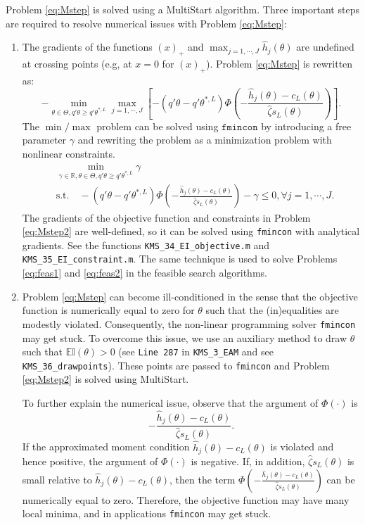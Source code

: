 \documentclass[12pt]{article}
\def\code#1{\texttt{#1}}
\begin{document}
Problem \eqref{eq:Mstep} is solved using a MultiStart algorithm.  Three important steps are required to resolve numerical issues with Problem \eqref{eq:Mstep}:
\begin{enumerate}
\item The gradients of the functions $(x)_{+}$ and $\max_{j=1,\cdots,J} \hat h_j(\theta)$ are undefined at crossing points (e.g, at $x=0$ for $(x)_+$).  Problem \eqref{eq:Mstep} is rewritten as:
     \[
        - \min_{\theta \in \Theta,q'\theta \geq q' \theta^{*,L}} \max_{j=1,\cdots,J}\left[-(q' \theta - q' \theta^{*,L})\Phi \left(- \frac{ \hat h_j(\theta) - c_L(\theta)}{\hat \zeta s_L(\theta)} \right)\right].
     \]
    The $\min/\max$ problem can be solved using $\code{fmincon}$ by introducing a free parameter $\gamma$ and rewriting the problem as a minimization problem with nonlinear constraints.
    \begin{align}\label{eq:Mstep2}
        & \min_{\gamma \in \mathbb{R}, \theta \in \Theta,q'\theta \geq q' \theta^{*,L}}  \gamma \\
        & \text{s.t.} \quad
        -(q' \theta - q' \theta^{*,L})\Phi \left(- \frac{  \hat h_j(\theta) - c_L(\theta)}{\hat \zeta s_L(\theta)} \right) - \gamma \leq 0, \forall j = 1,\cdots,J.\nonumber
    \end{align}
    The gradients of the objective function and constraints in Problem \eqref{eq:Mstep2} are well-defined, so it can be solved using \code{fmincon} with analytical gradients.  See the functions \code{KMS\_34\_EI\-\_objective.m} and \code{KMS\_35\_EI\_constraint.m}.  The same technique is used to solve Problems \eqref{eq:feas1} and \eqref{eq:feas2} in the feasible search algorithms.

\item Problem \eqref{eq:Mstep} can become ill-conditioned in the sense that the objective function is numerically equal to zero for $\theta$ such that the (in)equalities are modestly violated. Consequently, the non-linear programming solver \code{fmincon} may get stuck.  To overcome this issue, we use an auxiliary method to draw $\theta$ such that $\mathbb{E}\mathbb{I}(\theta)>0$ (see \code{Line 287} in \code{KMS\_3\_EAM} and see \code{KMS\_36\_drawpoints}).  These points are passed to \code{fmincon} and Problem \eqref{eq:Mstep2} is solved using MultiStart.

     To further explain the numerical issue, observe that the argument of $\Phi(\cdot)$ is
     \[
     - \frac{ \hat  h_j(\theta) - c_L(\theta)}{\hat \zeta s_L(\theta)}.
     \]
     If the approximated moment condition $\hat h_j(\theta) - c_L(\theta)$ is violated and hence positive, the argument of $\Phi(\cdot)$ is negative.  If, in addition, $\hat \zeta s_L(\theta)$ is small relative to $\hat h_j(\theta) - c_L(\theta)$, then the term $\Phi \left(  - \frac{  \hat h_j(\theta) - c_L(\theta)}{\hat \zeta s_L(\theta)}\right)$ can be numerically equal to zero.  Therefore, the objective function may have many local minima, and in applications \code{fmincon} may get stuck.


\end{enumerate}
\end{document}
